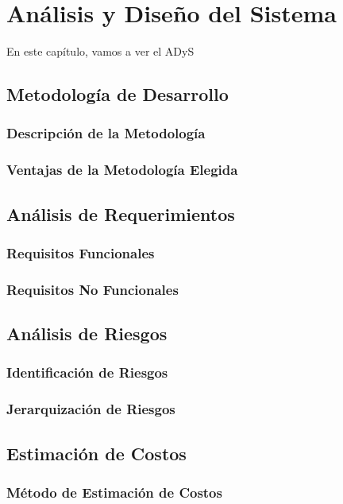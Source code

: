 \chapter{Análisis y Diseño del Sistema}\label{ch:Análisis y diseño del sistema}
En este capítulo, vamos a ver el ADyS

\section{Metodología de Desarrollo}
\subsection{Descripción de la Metodología}
\subsection{Ventajas de la Metodología Elegida}

\section{Análisis de Requerimientos}
\subsection{Requisitos Funcionales}
\subsection{Requisitos No Funcionales}

\section{Análisis de Riesgos}
\subsection{Identificación de Riesgos}
\subsection{Jerarquización de Riesgos}

\section{Estimación de Costos}
\subsection{Método de Estimación de Costos}
